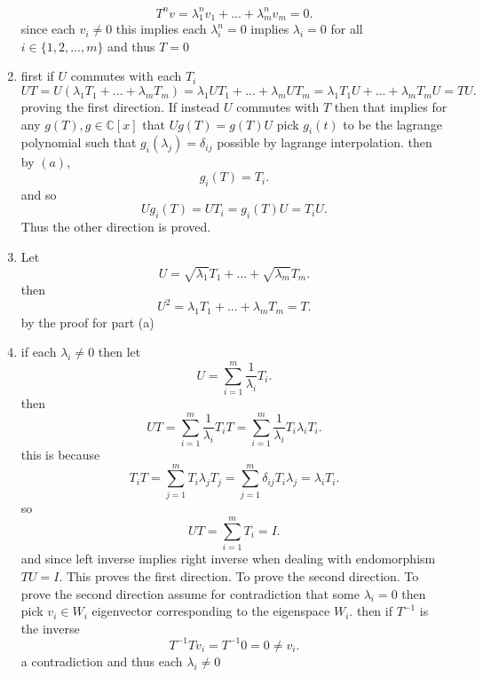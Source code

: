 \documentclass{article}
\begin{document}
\begin{enumerate}[label = (\alph*)]
                \[
                T^{n}v = \lambda_1^{n}v_1 + ...  + \lambda_m^{n}v_m = 0
                .\] 
                since each $v_i \ne 0$ this implies each $\lambda_i^{n} = 0$ implies $\lambda_i = 0$ for all $i \in \{1,2,...,m\}$
                and thus  $T = 0$
            \item 
                first if $U$ commutes with each $T_i$
                \[
                    UT = U(\lambda_1T_1 + ... + \lambda_mT_m) = \lambda_1UT_1 + ... + \lambda_mUT_m = \lambda_1T_1U + ... + \lambda_mT_mU = TU
                .\] 
                proving the first direction. If instead $U$ commutes with $T$ then that implies
                for any $g(T), g \in \mathbb{C}[x]$ that $Ug(T) = g(T)U$ pick  $g_i(t)$ to be the lagrange polynomial
                such that $g_i(\lambda_j) = \delta_{ij}$ possible by lagrange interpolation. then by $(a)$,
                 \[
                g_i(T) = T_i
                .\] 
                and so
                \[
                Ug_i(T) = UT_i = g_i(T)U = T_iU
                .\] 
                Thus the other direction is proved.
            \item Let 
                \[
                U = \sqrt{\lambda_1}T_1 + ... + \sqrt{\lambda_m}T_m
                .\] 
                then
                \[
                U^2 = \lambda_1T_1 + ... + \lambda_mT_m = T
                .\] 
                by the proof for part (a)
            \item if each $\lambda_i \ne 0$ then let
                \[
                U = \sum_{i=1}^{m}\frac{1}{\lambda_i}T_i
                .\] 
                then
                \[
                UT = \sum_{i=1}^{m}\frac{1}{\lambda_i}T_iT = \sum_{i=1}^{m}\frac{1}{\lambda_i}T_i\lambda_iT_i
                .\] 
                this is because
                \[
                    T_iT = \sum_{j=1}^{m}T_i\lambda_jT_j = \sum_{j=1}^{m}\delta_{ij}T_i\lambda_j = \lambda_iT_i
                .\] 
                so
                \[
                UT = \sum_{i=1}^{m}T_i = I
                .\] 
                and since left inverse implies right inverse when dealing with endomorphism $TU = I$.
                This proves the first direction. To prove the second direction. To prove the second direction assume for contradiction that some $\lambda_i = 0$ then pick $v_i \in W_i$ eigenvector corresponding to the eigenspace  $W_i$.
                then if $T^{-1}$ is the inverse
                \[
                T^{-1}Tv_i = T^{-1}0 = 0 \ne v_i
                .\] 
                a contradiction and thus each $\lambda_i \ne 0$

\end{enumerate}
\end{document}
